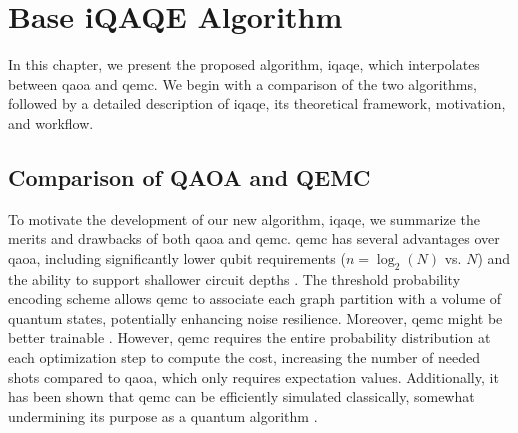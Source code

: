 
\chapter{Base iQAQE Algorithm}
\label{chapter:Base Algorithm}


In this chapter, we present the proposed algorithm, \acrshort{iqaqe}, which interpolates between \acrshort{qaoa} and \acrshort{qemc}. We begin with a comparison of the two algorithms, followed by a detailed description of \acrshort{iqaqe}, its theoretical framework, motivation, and workflow.

\section{Comparison of QAOA and QEMC}
To motivate the development of our new algorithm, \acrshort{iqaqe}, we summarize the merits and drawbacks of both \acrshort{qaoa} and \acrshort{qemc}. \acrshort{qemc} has several advantages over \acrshort{qaoa}, including significantly lower qubit requirements ($n = \log_2(N)$ vs. $N$) and the ability to support shallower circuit depths \cite{tenecohen2023variational}. The threshold probability encoding scheme allows \acrshort{qemc} to associate each graph partition with a volume of quantum states, potentially enhancing noise resilience. Moreover, \acrshort{qemc} might be better trainable \cite{tenecohen2023variational}. However, \acrshort{qemc} requires the entire probability distribution at each optimization step to compute the cost, increasing the number of needed shots compared to \acrshort{qaoa}, which only requires expectation values. Additionally, it has been shown that \acrshort{qemc} can be efficiently simulated classically, somewhat undermining its purpose as a quantum algorithm \cite{tenecohen2023variational}.

